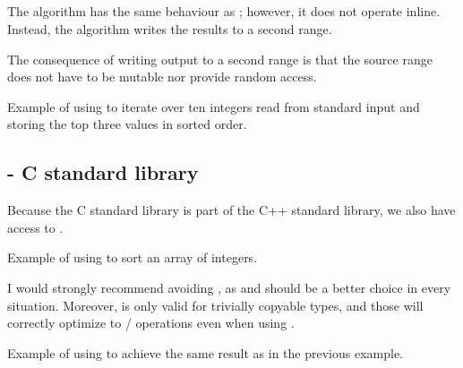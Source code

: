 \subsection{\texorpdfstring{}{\texttt{std::partial\_sort\_copy}}}

The  algorithm has the same behaviour as \linebreak{}; however, it does not operate inline. Instead, the algorithm writes the results to a second range.


The consequence of writing output to a second range is that the source range does not have to be mutable nor provide random access.

\begin{codebox}[]{\href{https://compiler-explorer.com/z/vjKc5nY31}{\ExternalLink}}
\footnotesize Example of using  to iterate over ten integers read from standard input and storing the top three values in sorted order.
\tcblower
{}
\end{codebox}

\subsection{\texorpdfstring{}{\texttt{qsort}} - C standard library}

Because the C standard library is part of the C++ standard library, we also have access to .

\begin{codebox}[]{\href{https://compiler-explorer.com/z/Y4E63aThP}{\ExternalLink}}
\footnotesize Example of using  to sort an array of integers.
\tcblower
{}
\end{codebox}

I would strongly recommend avoiding , as  and  should be a better choice in every situation. Moreover,  is only valid for trivially copyable types, and those will correctly optimize to  /  operations even when using .

\begin{codebox}[]{\href{https://compiler-explorer.com/z/nT9GPh8Tq}{\ExternalLink}}
\footnotesize Example of using  to achieve the same result as in the previous example.
\tcblower
{}
\end{codebox}